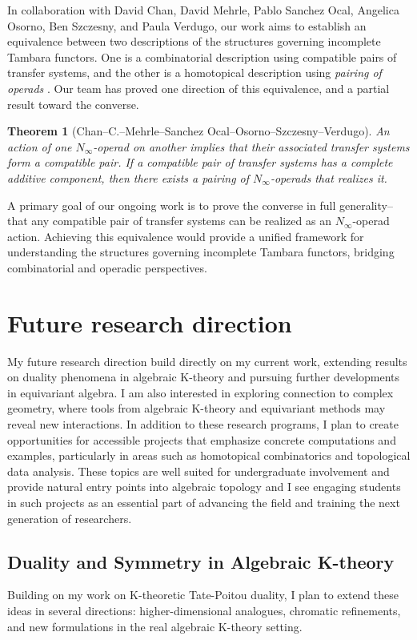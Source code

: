 \documentclass[11pt]{article}
\newtheorem{theorem}{Theorem}
\begin{document}
In collaboration with David Chan, David Mehrle, Pablo Sanchez Ocal, Angelica Osorno, Ben Szczesny, and Paula Verdugo, our work aims to establish an equivalence between two descriptions of the structures governing incomplete Tambara functors. 
One is a combinatorial description using compatible pairs of transfer systems, and the other is a homotopical description using {\it pairing of operads} \cite{MR2544392}. Our team has proved one direction of this equivalence, and a partial result toward the converse.
\begin{theorem}[Chan--C.--Mehrle--Sanchez Ocal--Osorno--Szczesny--Verdugo]
An action of one $N_\infty$-operad on another implies that their associated transfer systems form a compatible pair.
If a compatible pair of transfer systems has a complete additive component, then there exists a pairing of $N_\infty$-operads that realizes it.
\end{theorem}
A primary goal of our ongoing work is to prove the converse in full generality--that any compatible pair of transfer systems can be realized as an $N_\infty$-operad action. Achieving this equivalence would provide a unified framework for understanding the structures governing incomplete Tambara functors, bridging combinatorial and operadic perspectives.


\section{Future research direction}

My future research direction build directly on my current work, extending results on duality phenomena in algebraic K-theory and pursuing further developments in equivariant algebra.
I am also interested in exploring connection to complex geometry, where tools from algebraic K-theory and equivariant methods may reveal new interactions.
In addition to these research programs, I plan to create opportunities for accessible projects that emphasize concrete computations and examples, particularly in areas such as homotopical combinatorics and topological data analysis.
These topics are well suited for undergraduate involvement and provide natural entry points into algebraic topology and I see engaging students in such projects as an essential part of advancing the field and training the next generation of researchers.

\subsection*{Duality and Symmetry in Algebraic K-theory}
Building on my work on K-theoretic Tate-Poitou duality, I plan to extend these ideas in several directions: higher-dimensional analogues, chromatic refinements, and new formulations in the real algebraic K-theory setting.
\end{document}
